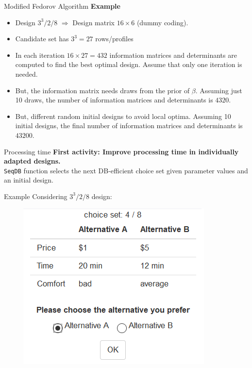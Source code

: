 \documentclass[11pt,t]{beamer}
\begin{document}
\begin{frame}[fragile]{Modified Fedorov Algorithm}
\textbf{Example}\\
\begin{itemize}
	\item Design $3^3/2/8$ $\Rightarrow$ Design matrix $16 \times 6$ (dummy coding).
	\item Candidate set has $3^3 = 27$ rows/profiles
	\item In each iteration $16 \times 27 = 432$ information matrices and determinants are computed to find the best optimal design. Assume that only one iteration is needed.
	\item But, the information matrix needs draws from the prior of $\beta$. Assuming just 10 draws, the number of information matrices and determinants is $4320$.
	\item But, different random initial designs to avoid local optima. Assuming 10 initial designs, the final number of information matrices and determinants is $43200$.
\end{itemize}	
\end{frame}

\begin{frame}[fragile]{Processing time}
\textbf{First activity: Improve processing time in individually adapted designs.}\\
	\texttt{SeqDB} function selects the next DB-efficient choice set given parameter values and an initial design.
	
	\begin{exampleblock}{Example}
		Considering $3^3/2/8$ design:
		\begin{figure}
			\centering
			\includegraphics[scale = .5]{mygraphics/choiceset.png}
		\end{figure}
	\end{exampleblock}
\end{frame}
\end{document}
